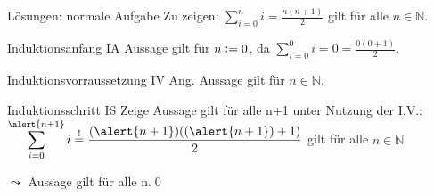 {\begin{frame}[fragile]{Lösungen: normale Aufgabe}
    Zu zeigen: $\displaystyle\sum_{i=0}^{n} i = \frac{n(n+1)}{2}$ gilt für alle $n \in \mathbb{N}$.
    \begin{alertblock}{Induktionsanfang IA}
        Aussage gilt für $n\vcentcolon= 0$, da $\displaystyle\sum_{i=0}^{0} i = 0 = \frac{0(0+1)}{2}$.
    \end{alertblock}
    \begin{alertblock}{Induktionsvorraussetzung IV}
        Ang. Aussage gilt für $n \in\mathbb{N}$.
    \end{alertblock}
    \begin{alertblock}{Induktionsschritt IS}
        Zeige Aussage gilt für alle n+1 unter Nutzung der I.V.:\\
        $\displaystyle\sum_{i=0}^{\alert{n+1}} i \overset{!}{=} \frac{(\alert{n+1})((\alert{n+1})+1)}{2}$ gilt für alle $n \in \mathbb{N}$
    \end{alertblock}
    \alert{$\leadsto$ Aussage gilt für alle n.}\qed
\end{frame}
}


